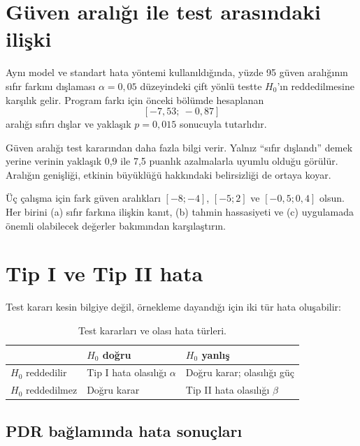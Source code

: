 \section{Güven aralığı ile test arasındaki ilişki}

Aynı model ve standart hata yöntemi kullanıldığında, yüzde 95 güven aralığının
sıfır farkını dışlaması $\alpha=0{,}05$ düzeyindeki çift yönlü testte
$H_0$'ın reddedilmesine karşılık gelir. Program farkı için önceki bölümde
hesaplanan
\[
[-7{,}53;\ -0{,}87]
\]
aralığı sıfırı dışlar ve yaklaşık $p=0{,}015$ sonucuyla tutarlıdır.

Güven aralığı test kararından daha fazla bilgi verir. Yalnız ``sıfır
dışlandı'' demek yerine verinin yaklaşık 0,9 ile 7,5 puanlık azalmalarla
uyumlu olduğu görülür. Aralığın genişliği, etkinin büyüklüğü hakkındaki
belirsizliği de ortaya koyar.

\begin{etkinlik}
Üç çalışma için fark güven aralıkları $[-8;-4]$, $[-5;2]$ ve $[-0{,}5;0{,}4]$
olsun. Her birini (a) sıfır farkına ilişkin kanıt, (b) tahmin hassasiyeti ve
(c) uygulamada önemli olabilecek değerler bakımından karşılaştırın.
\end{etkinlik}

\section{Tip I ve Tip II hata}

Test kararı kesin bilgiye değil, örnekleme dayandığı için iki tür hata
oluşabilir:

\begin{table}[htbp]
\centering
\caption{Test kararları ve olası hata türleri.}
\begin{tabular}{@{}p{}p{}p{}@{}}
\toprule
 & $H_0$ doğru & $H_0$ yanlış \\
\midrule
$H_0$ reddedilir & Tip I hata olasılığı $\alpha$ & Doğru karar; olasılığı güç \\
$H_0$ reddedilmez & Doğru karar & Tip II hata olasılığı $\beta$ \\
\bottomrule
\end{tabular}
\end{table}

\subsection{PDR bağlamında hata sonuçları}

